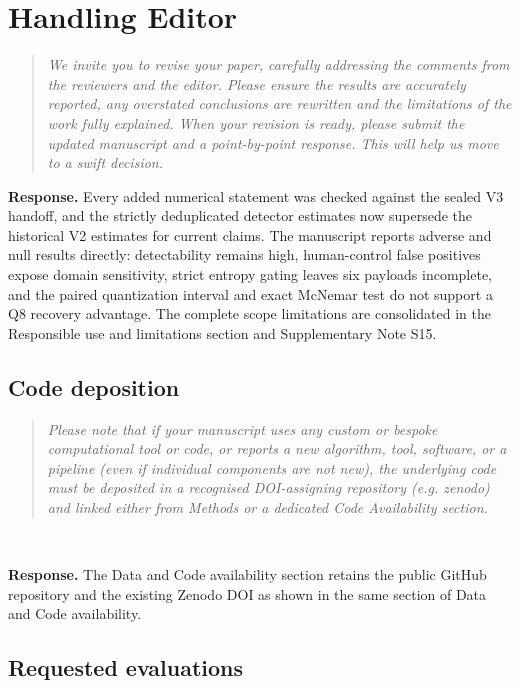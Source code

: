 \documentclass[11pt]{article}
\newenvironment{reviewcomment}{\begin{quote}\color{commentgray}\itshape}{\end{quote}}
\begin{document}
\section*{Handling Editor}

\begin{reviewcomment}
We invite you to revise your paper, carefully addressing the comments from the reviewers and the editor. Please ensure the results are accurately reported, any overstated conclusions are rewritten and the limitations of the work fully explained. When your revision is ready, please submit the updated manuscript and a point-by-point response. This will help us move to a swift decision.
\end{reviewcomment}

\noindent\textbf{Response.}
Every added numerical statement was checked against the sealed V3 handoff, and the strictly deduplicated detector estimates now supersede the historical V2 estimates for current claims. The manuscript reports adverse and null results directly: detectability remains high, human-control false positives expose domain sensitivity, strict entropy gating leaves six payloads incomplete, and the paired quantization interval and exact McNemar test do not support a Q8 recovery advantage. The complete scope limitations are consolidated in the Responsible use and limitations section and Supplementary Note S15.


\subsection*{Code deposition}

\begin{reviewcomment}
Please note that if your manuscript uses any custom or bespoke computational tool or code, or reports a new algorithm, tool, software, or a pipeline (even if individual components are not new), the underlying code must be deposited in a recognised DOI-assigning repository (e.g. zenodo) and linked either from Methods or a dedicated Code Availability section.
\end{reviewcomment}

\

\noindent\textbf{Response.}
The Data and Code availability section retains the public GitHub repository and the existing Zenodo DOI as shown in the same section of Data and Code availability.


\subsection*{Requested evaluations}
\end{document}
